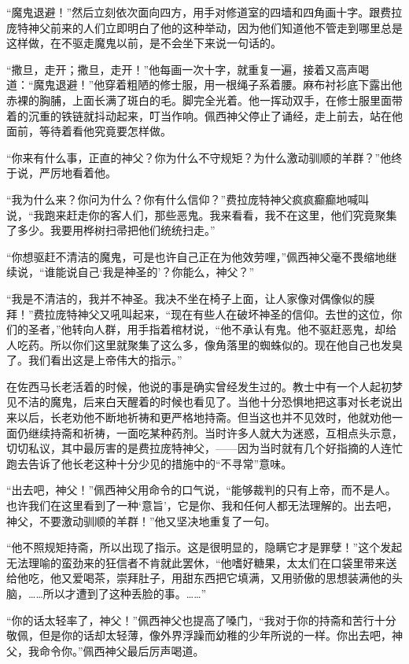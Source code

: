 \par “魔鬼退避！”然后立刻依次面向四方，用手对修道室的四墙和四角画十字。跟费拉庞特神父前来的人们立即明白了他的这种举动，因为他们知道他不管走到哪里总是这样做，在不驱走魔鬼以前，是不会坐下来说一句话的。
\par “撒旦，走开；撒旦，走开！”他每画一次十字，就重复一遍，接着又高声喝道：“魔鬼退避！”他穿着粗陋的修士服，用一根绳子系着腰。麻布衬衫底下露出他赤裸的胸脯，上面长满了斑白的毛。脚完全光着。他一挥动双手，在修士服里面带着的沉重的铁链就抖动起来，叮当作响。佩西神父停止了诵经，走上前去，站在他面前，等待着看他究竟要怎样做。
\par “你来有什么事，正直的神父？你为什么不守规矩？为什么激动驯顺的羊群？”他终于说，严厉地看着他。
\par “我为什么来？你问为什么？你有什么信仰？”费拉庞特神父疯疯癫癫地喊叫说，“我跑来赶走你的客人们，那些恶鬼。我来看看，我不在这里，他们究竟聚集了多少。我要用桦树扫帚把他们统统扫走。”
\par “你想驱赶不清洁的魔鬼，可是也许自己正在为他效劳哩，”佩西神父毫不畏缩地继续说，“谁能说自己‘我是神圣的’？你能么，神父？”
\par “我是不清洁的，我并不神圣。我决不坐在椅子上面，让人家像对偶像似的膜拜！”费拉庞特神父又吼叫起来，“现在有些人在破坏神圣的信仰。去世的这位，你们的圣者，”他转向人群，用手指着棺材说，“他不承认有鬼。他不驱赶恶鬼，却给人吃药。所以你们这里就聚集了这么多，像角落里的蜘蛛似的。现在他自己也发臭了。我们看出这是上帝伟大的指示。”
\par 在佐西马长老活着的时候，他说的事是确实曾经发生过的。教士中有一个人起初梦见不洁的魔鬼，后来白天醒着的时候也看见了。当他十分恐惧地把这事对长老说出来以后，长老劝他不断地祈祷和更严格地持斋。但当这也并不见效时，他就劝他一面仍继续持斋和祈祷，一面吃某种药剂。当时许多人就大为迷惑，互相点头示意，切切私议，其中最厉害的是费拉庞特神父，——因为当时就有几个好指摘的人连忙跑去告诉了他长老这种十分少见的措施中的“不寻常”意味。
\par “出去吧，神父！”佩西神父用命令的口气说，“能够裁判的只有上帝，而不是人。也许我们在这里看到了一种‘意旨’，它是你、我和任何人都无法理解的。出去吧，神父，不要激动驯顺的羊群！”他又坚决地重复了一句。
\par “他不照规矩持斋，所以出现了指示。这是很明显的，隐瞒它才是罪孽！”这个发起无法理喻的蛮劲来的狂信者不肯就此罢休，“他嗜好糖果，太太们在口袋里带来送给他吃，他又爱喝茶，崇拜肚子，用甜东西把它填满，又用骄傲的思想装满他的头脑，……所以才遭到了这种丢脸的事。……”
\par “你的话太轻率了，神父！”佩西神父也提高了嗓门，“我对于你的持斋和苦行十分敬佩，但是你的话却太轻薄，像外界浮躁而幼稚的少年所说的一样。你出去吧，神父，我命令你。”佩西神父最后厉声喝道。
